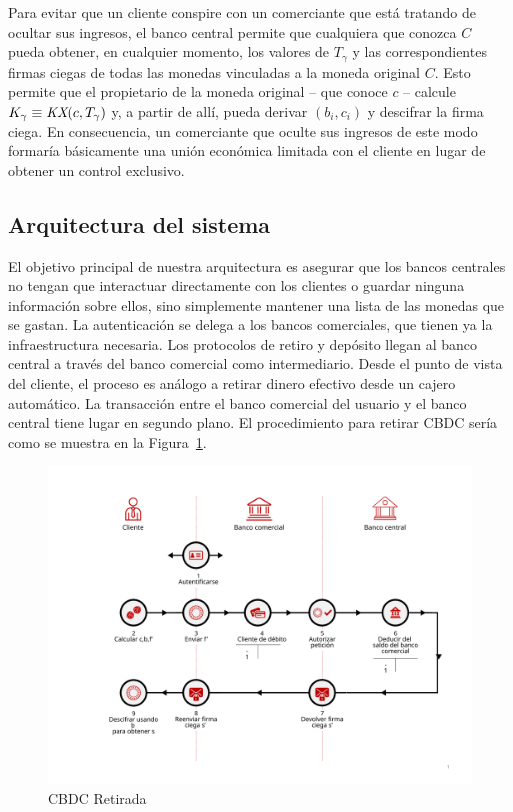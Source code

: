 \documentclass[10pt,spanish]{article}
\begin{document}
Para evitar que un cliente conspire con un comerciante que está tratando
de ocultar sus ingresos, el banco central permite que cualquiera que
conozca $C$ pueda obtener, en cualquier momento, los valores de
$T_{\gamma}$ y las correspondientes firmas ciegas de todas las monedas
vinculadas a la moneda original $C$. Esto permite que el propietario de la
moneda original -- que conoce $c$ -- calcule
$K_{\gamma} \equiv \emph{KX}( c,T_{\gamma})$ y, a partir de
allí, pueda derivar $(b_{i},c_{i})$ y descifrar la firma
ciega. En consecuencia, un comerciante que oculte sus ingresos de este
modo formaría básicamente una unión económica limitada con el cliente en
lugar de obtener un control exclusivo.

\hypertarget{arquitectura-del-sistema}{%
\subsection{Arquitectura del sistema}\label{arquitectura-del-sistema}}

El objetivo principal de nuestra arquitectura es asegurar que los bancos
centrales no tengan que interactuar directamente con los clientes o
guardar ninguna información sobre ellos, sino simplemente mantener una
lista de las monedas que se gastan. La autenticación se delega a los
bancos comerciales, que tienen ya la infraestructura necesaria. Los
protocolos de retiro y depósito llegan al banco central a través del
banco comercial como intermediario. Desde el punto de vista del cliente,
el proceso es análogo a retirar dinero efectivo desde un cajero
automático. La transacción entre el banco comercial del usuario y el
banco central tiene lugar en segundo plano. El procedimiento para
retirar CBDC sería como se muestra en la Figura~\ref{fig:fig1}.

\begin{figure}[h!]
  \includegraphics[width=\textwidth]{retirada.pdf}
  \caption{CBDC Retirada}
  \label{fig:fig1}
\end{figure}
\end{document}
